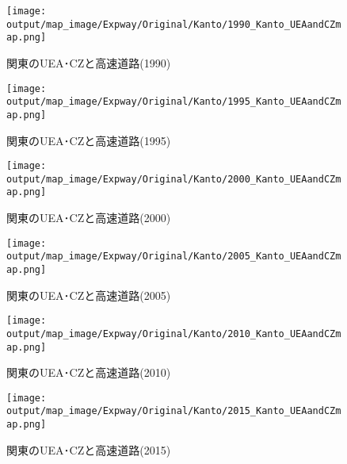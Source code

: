 \documentclass{ltjsarticle}
\begin{document}
\begin{figure}[pbth]
  \centering
  \texttt{[image: output/map\_image/Expway/Original/Kanto/1990\_Kanto\_UEAandCZmap.png]}
  \caption{\label{1990:KanCZandUEA}関東のUEA･CZと高速道路(1990)}
\end{figure}


\begin{figure}[pbth]
  \centering
  \texttt{[image: output/map\_image/Expway/Original/Kanto/1995\_Kanto\_UEAandCZmap.png]}
  \caption{\label{1995:KanCZandUEA}関東のUEA･CZと高速道路(1995)}
\end{figure}


\begin{figure}[pbth]
  \centering
  \texttt{[image: output/map\_image/Expway/Original/Kanto/2000\_Kanto\_UEAandCZmap.png]}
  \caption{\label{2000:KanCZandUEA}関東のUEA･CZと高速道路(2000)}
\end{figure}


\begin{figure}[pbth]
  \centering
  \texttt{[image: output/map\_image/Expway/Original/Kanto/2005\_Kanto\_UEAandCZmap.png]}
  \caption{\label{2005:KanCZandUEA}関東のUEA･CZと高速道路(2005)}
\end{figure}


\begin{figure}[pbth]
  \centering
  \texttt{[image: output/map\_image/Expway/Original/Kanto/2010\_Kanto\_UEAandCZmap.png]}
  \caption{\label{2010:KanCZandUEA}関東のUEA･CZと高速道路(2010)}
\end{figure}


\begin{figure}[pbth]
  \centering
  \texttt{[image: output/map\_image/Expway/Original/Kanto/2015\_Kanto\_UEAandCZmap.png]}
  \caption{\label{2015:KanCZandUEA}関東のUEA･CZと高速道路(2015)}
\end{figure}
\end{document}
